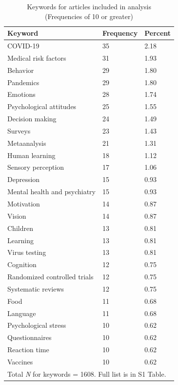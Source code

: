\documentclass[authordate, meta, issue]{jote-new-article}
\begin{document}
	\begin{table}
		\centering
		\begin{fullwidth}
			\caption{Keywords for articles included in analysis\\ (Frequencies of 10 or greater)}
			\begin{tabularx}{\linewidth}{@{} l X X @{}}
				\toprule
				\textbf{Keyword} & \textbf{Frequency} & \textbf{Percent} \\
				\midrule
				COVID-19 & 35 & 2.18 \\
				Medical risk factors & 31 & 1.93 \\
				Behavior & 29 & 1.80 \\
				Pandemics & 29 & 1.80 \\
				Emotions & 28 & 1.74 \\
				Psychological attitudes & 25 & 1.55 \\
				Decision making & 24 & 1.49 \\
				Surveys & 23 & 1.43 \\
				Metaanalysis & 21 & 1.31 \\
				Human learning & 18 & 1.12 \\
				Sensory perception & 17 & 1.06 \\
				Depression & 15 & 0.93 \\
				Mental health and psychiatry & 15 & 0.93 \\
				Motivation & 14 & 0.87 \\
				Vision & 14 & 0.87 \\
				Children & 13 & 0.81 \\
				Learning & 13 & 0.81 \\
				Virus testing & 13 & 0.81 \\
				Cognition & 12 & 0.75 \\
				Randomized controlled trials & 12 & 0.75 \\
				Systematic reviews & 12 & 0.75 \\
				Food & 11 & 0.68 \\
				Language & 11 & 0.68 \\
				Psychological stress & 10 & 0.62 \\
				Questionnaires & 10 & 0.62 \\
				Reaction time & 10 & 0.62 \\
				Vaccines & 10 & 0.62 \\
				\bottomrule
				\multicolumn{3}{l}{Total \emph{N} for keywords = 1608.  Full list is in S1 Table.} \\
				
			\end{tabularx}
		\end{fullwidth}
	\end{table}
	
\end{document}
